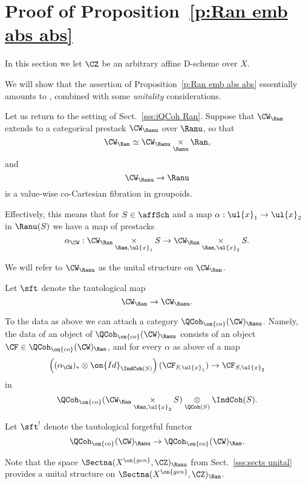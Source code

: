 \documentclass[9pt]{amsart}
\theoremstyle{remark}
\theoremstyle{definition}
\theoremstyle{remark}
\newcommand{\secref}[1]{Sect.~\ref{#1}}
\newcommand{\propref}[1]{Proposition~\ref{#1}}
\numberwithin{equation}{section}
\begin{document}
\section{Proof of \propref{p:Ran emb abs abs}} \label{s:proof of Ran emb abs abs}

In this section we let $\CZ$ be an arbitrary affine D-scheme over $X$. 

\medskip

We will show that the assertion of \propref{p:Ran emb abs abs} essentially amounts to 
\cite[Proposition 4.6.5]{BD1}, combined with some \emph{unitality} considerations. 



\sssec{}

Let us return to the setting of \secref{sss:iQCoh Ran}. Suppose that $\CW_\Ran$ extends to a categorical prestack $\CW_\Ranu$ over $\Ranu$,
so that
$$\CW_\Ran\simeq \CW_\Ranu\underset{\Ranu}\times \Ran,$$
and 
$$\CW_\Ranu\to \Ranu$$
is a value-wise co-Cartesian fibration in groupoids.

\medskip

Effectively, this means that for $S\in \affSch$ and a map $\alpha:\ul{x}_1\to \ul{x}_2$ in $\Ranu(S)$ we have a map of prestacks
$$\alpha_\CW:\CW_\Ran\underset{\Ran,\ul{x}_1}\times S \to \CW_\Ran\underset{\Ran,\ul{x}_2}\times S.$$

\medskip

We will refer to $\CW_\Ranu$ as the unital structure on $\CW_\Ran$. 

\medskip

Let $\sft$ denote the tautological map
$$\CW_\Ran\to \CW_\Ranu.$$

\sssec{} \label{sss:iQCoh unital}

To the data as above we can attach a category $\QCoh_{\on{co}}(\CW)_\Ranu$. Namely, the data of an object of $\QCoh_{\on{co}}(\CW)_\Ranu$
consists of an object $\CF\in \QCoh_{\on{co}}(\CW)_\Ran$, and for every $\alpha$ as above of a map
$$\left((\alpha_\CW)_*\otimes \on{Id}_{\IndCoh(S)}\right)(\CF_{S,\ul{x}_1})  \to \CF_{S,\ul{x}_2}$$
in 
$$\QCoh_{\on{co}}(\CW_\Ran\underset{\Ran,\ul{x}_2}\times S)\underset{\QCoh(S)}\otimes \IndCoh(S).$$

\medskip

Let $\sft^!$ denote the tautological forgetful functor
$$\QCoh_{\on{co}}(\CW)_\Ranu\to \QCoh_{\on{co}}(\CW)_\Ran.$$

\sssec{}

Note that the space $\Sectna(X^{\on{gen}},\CZ)_\Ranu$ from \secref{sss:sects unital} provides a unital structure on 
$\Sectna(X^{\on{gen}},\CZ)_\Ran$.
\end{document}
